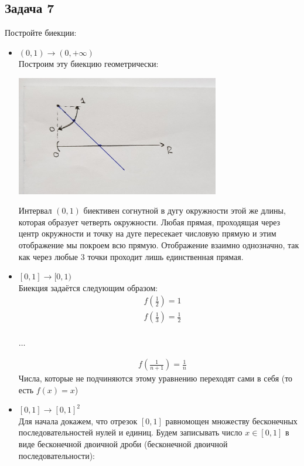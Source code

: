 \documentclass[a4paper,12pt]{article} %
\begin{document}
\subsection*{Задача 7}
Постройте биекции: 
\begin{itemize}
\item $(0, 1) \rightarrow (0, +\infty)$\\
Построим эту биекцию геометрически:
\begin{center}
\includegraphics[width=0.7\textwidth]{p_a}
\end{center}
Интервал $(0, 1)$ биективен согнутной в дугу окружности этой же длины, которая образует четверть окружности. Любая прямая, проходящая через центр окружности и точку на дуге пересекает числовую прямую и этим отображение мы покроем всю прямую. Отображение взаимно однозначно, так как через любые 3 точки проходит лишь единственная прямая.
\item $[0, 1] \rightarrow [0, 1)$\\
Биекция задаётся следующим образом:
$$
\begin{aligned}
&f\left(\frac{1}{2}\right)=1\\
&f\left(\frac{1}{3}\right)=\frac{1}{2}\\
\end{aligned}
$$
\begin{center}
 $\ldots $
\end{center}
$$
\begin{aligned}
&f\left(\frac{1}{n+1}\right)=\frac{1}{n}
\end{aligned}
$$
Числа, которые не подчиняются этому уравнению переходят сами в себя (то есть $f(x) = x$)
\item $[0, 1] \rightarrow [0, 1]^2$\\
Для начала докажем, что отрезок $[0, 1]$ равномощен множеству бесконечных последовательностей нулей и единиц. Будем записывать число $x \in [0, 1]$ в виде бесконечной двоичной дроби (бесконечной двоичной последовательности):\\

\end{itemize}
\end{document}
